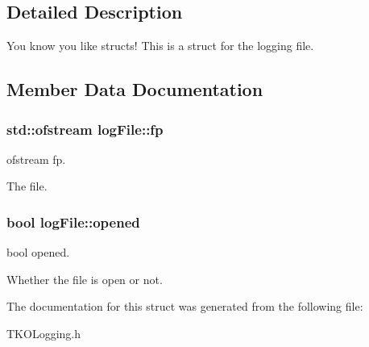 \subsection{Detailed Description}
You know you like structs! This is a struct for the logging file. 

\subsection{Member Data Documentation}
\hypertarget{structlog_file_a78d1ffa2264f3fcb04177e06803a9426}{
\subsubsection[{fp}]{\setlength{\rightskip}{0pt plus 5cm}std\-::ofstream {\bf log\-File\-::fp}}}\label{structlog_file_a78d1ffa2264f3fcb04177e06803a9426}


ofstream fp. 

The file. \hypertarget{structlog_file_a4a069d00b4f684751ecba0c9625eeae6}{
\subsubsection[{opened}]{\setlength{\rightskip}{0pt plus 5cm}bool {\bf log\-File\-::opened}}}\label{structlog_file_a4a069d00b4f684751ecba0c9625eeae6}


bool opened. 

Whether the file is open or not. 

The documentation for this struct was generated from the following file\-:\begin{DoxyCompactItemize}
\item 
T\-K\-O\-Logging.\-h\end{DoxyCompactItemize}
